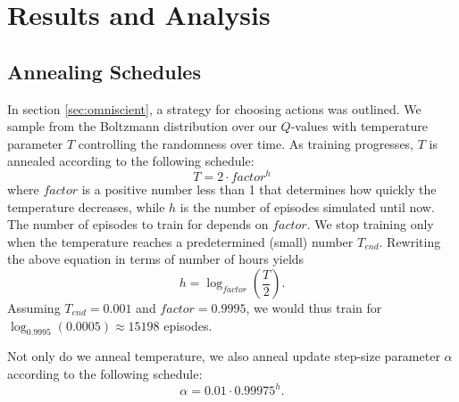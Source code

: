 \section{Results and Analysis}

\subsection{Annealing Schedules}
\label{sec:annealing_schedules}

In section \ref{sec:omniscient}, a strategy for choosing actions was outlined. We sample from the Boltzmann distribution over our $Q$-values with temperature parameter $T$ controlling the randomness over time. As training progresses, $T$ is annealed according to the following schedule:
\[
T = 2 \cdot factor^h
\]
where $factor$ is a positive number less than 1 that determines how quickly the temperature decreases, while $h$ is the number of episodes simulated until now. The number of episodes to train for depends on $factor$. We stop training only when the temperature reaches a predetermined (small) number $T_{end}$. Rewriting the above equation in terms of number of hours yields 
\[
h = \log_{factor}\left(\frac{T}{2}\right).
\]
Assuming $T_{end} = 0.001$ and $factor = 0.9995$, we would thus train for $\log_{0.9995}(0.0005) \approx 15198$ episodes.

Not only do we anneal temperature, we also anneal update step-size parameter $\alpha$ according to the following schedule:
\[
\alpha = 0.01 \cdot 0.99975^h.
\]
